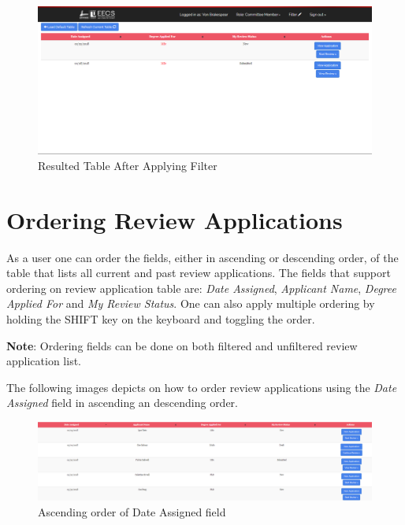 \documentclass[fontsize=12pt,paper=letter,twoside]{scrartcl}
\begin{document}
\begin{figure}[!htb]
\begin{center}
\includegraphics[width=.9\textwidth]{images/example_filter_table.png}
\end{center}
\caption{Resulted Table After Applying Filter}
\label{fig:resulted_table}
\end{figure}


\newpage
\section{Ordering Review Applications}
As a user one can order the fields, either in ascending or descending order, of the table that lists all current and past review applications. The fields that support ordering on review application table are: \emph{Date Assigned}, \emph{Applicant Name}, \emph{Degree Applied For} and \emph{My Review Status}. One can also apply multiple ordering by holding the SHIFT key on the keyboard and toggling the order.

\bigskip
\noindent \textbf{Note}: Ordering fields can be done on both filtered and unfiltered review application list.

\bigskip
\noindent The following images depicts on how to order review applications using the \emph{Date Assigned} field in ascending an descending order.

\begin{figure}[!htb]
\begin{center}
\includegraphics[width=.9\textwidth]{images/order_ascending.png}
\end{center}
\caption{Ascending order of Date Assigned field}
\label{fig:order_ascending}
\end{figure}
\end{document}
